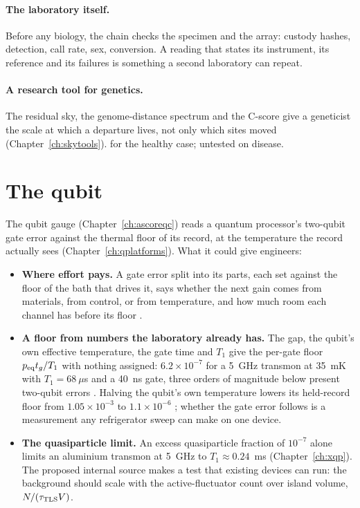 \paragraph{The laboratory itself.} Before any biology, the chain checks the specimen and the array: custody hashes, detection, call rate, sex,
conversion. A reading that states its instrument, its reference and its failures is
something a second laboratory can repeat.

\paragraph{A research tool for genetics.} The residual sky, the genome-distance spectrum and the C-score give a geneticist the scale at
which a departure lives, not only which sites moved (Chapter~\ref{ch:skytools}). \measured{} for the healthy case; untested on disease.

\section{The qubit}

The qubit gauge (Chapter~\ref{ch:ascoreqc}) reads a quantum processor's two-qubit gate error against the thermal floor of its record, at the
temperature the record actually sees (Chapter~\ref{ch:qplatforms}). What it could give engineers:
\begin{itemize}
\item \textbf{Where effort pays.} A gate error split into its parts, each set against the floor of the bath that drives it, says whether the
next gain comes from materials, from control, or from temperature, and how much room each channel has before its floor \interp.
\item \textbf{A floor from numbers the laboratory already has.} The gap, the qubit's own effective temperature, the gate time and $T_1$ give the
per-gate floor $p_{\rm eq}t_g/T_1$ with nothing assigned: $6.2\times10^{-7}$ for a 5~GHz transmon at 35~mK with $T_1=68~\mu$s and a 40~ns gate,
three orders of magnitude below present two-qubit errors \calc. Halving the qubit's own temperature lowers its held-record floor from
$1.05\times10^{-3}$ to $1.1\times10^{-6}$ \calc; whether the gate error follows is a measurement any refrigerator sweep can make on one device.
\openprob
\item \textbf{The quasiparticle limit.} An excess quasiparticle fraction of $10^{-7}$ alone limits an aluminium transmon at 5~GHz to
$T_1\approx0.24$~ms (Chapter~\ref{ch:xqp}). \calc{} The proposed internal source makes a test that existing devices can run: the background should
scale with the active-fluctuator count over island volume, $N/(\tau_{\rm TLS}V)$. \prediction
\end{itemize}

